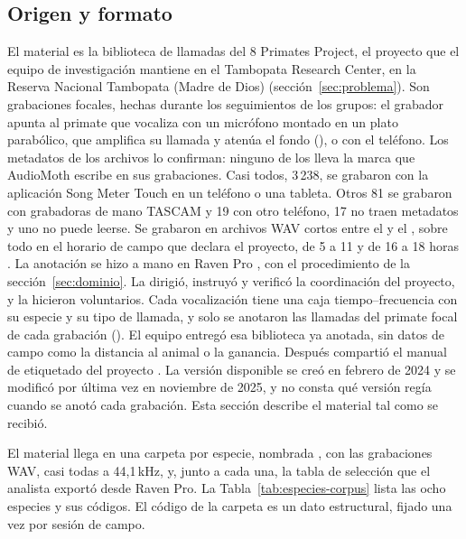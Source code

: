 \subsection{Origen y formato}
\label{sec:origen}

El material es la biblioteca de llamadas del 8 Primates Project, el proyecto que
el equipo de investigación mantiene en el Tambopata Research Center, en la
Reserva Nacional Tambopata (Madre de Dios) (sección~\ref{sec:problema}). Son
grabaciones focales, hechas durante los seguimientos de los grupos: el grabador
apunta al primate que vocaliza con un micrófono montado en un plato parabólico,
que amplifica su llamada y atenúa el fondo (\cpEquipo), o con el teléfono.
Los metadatos de los archivos lo confirman: ninguno de los \nRecordingsRaw{}
lleva la marca que AudioMoth escribe en sus grabaciones. Casi todos, 3\,238, se
grabaron con la aplicación Song Meter Touch en un teléfono o una tableta. Otros 81
se grabaron con grabadoras de mano TASCAM y 19 con otro teléfono, 17 no traen
metadatos y uno no puede leerse. Se grabaron en archivos WAV cortos entre el
\firstDate{} y el \lastDate{}, sobre todo en el horario de campo que declara el
proyecto, de 5 a 11 y de 16 a 18 horas \citep{wiredamazon_8primates}. La
anotación se hizo a mano en Raven Pro \citep{raven_pro}, con el procedimiento de
la sección~\ref{sec:dominio}. La dirigió, instruyó y verificó la coordinación del
proyecto, y la hicieron voluntarios. Cada vocalización tiene una caja
tiempo--frecuencia con su especie y su tipo de llamada, y solo se anotaron las
llamadas del primate focal de cada grabación (\cpEquipo). El equipo entregó esa
biblioteca ya anotada, sin datos de campo como la distancia al animal o la
ganancia. Después compartió el manual de etiquetado del proyecto
\citep{proyecto8_manual_2025}. La versión disponible se creó en febrero de 2024 y
se modificó por última vez en noviembre de 2025, y no consta qué versión regía
cuando se anotó cada grabación. Esta sección describe el material tal como se
recibió.

El material llega en una carpeta por especie, nombrada
, con las grabaciones WAV, casi todas a
44,1\,kHz, y, junto a cada una, la tabla de selección que el analista exportó desde Raven Pro. La
Tabla~\ref{tab:especies-corpus} lista las ocho especies y sus códigos. El código
de la carpeta es un dato estructural, fijado una vez por sesión de campo.

